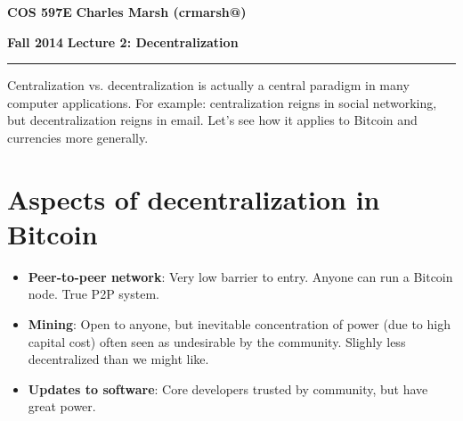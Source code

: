 \documentclass[12pt]{article}
\makeatletter
\newcommand{\myheader}[4]
{\vspace*{-0.5in}
\noindent
{#1} \hfill {#3}

\noindent
{#2} \hfill {#4}

\noindent
\rule[8pt]{\textwidth}{1pt}

\vspace{1ex} 
}  %
\newcommand{\myalgsheader}[0]
{\myheader
{ {\bf{COS 597E}} }
{ {\bf{Fall 2014}} }
{ {\bf{Charles Marsh (crmarsh@)}} }
{ {\bf{Lecture 2: Decentralization}} }
}
\makeatother
\begin{document}
\myalgsheader

\pagestyle{plain}

Centralization vs. decentralization is actually a central paradigm in many computer applications. For example: centralization reigns in social networking, but decentralization reigns in email. Let's see how it applies to Bitcoin and currencies more generally.

\section*{Aspects of decentralization in Bitcoin}
\begin{itemize}
\item \textbf{Peer-to-peer network}: Very low barrier to entry. Anyone can run a Bitcoin node. True P2P system.
\item \textbf{Mining}: Open to anyone, but inevitable concentration of power (due to high capital cost) often seen as undesirable by the community. Slighly less decentralized than we might like.
\item \textbf{Updates to software}: Core developers trusted by community, but have great power.
\end{itemize}
\end{document}

